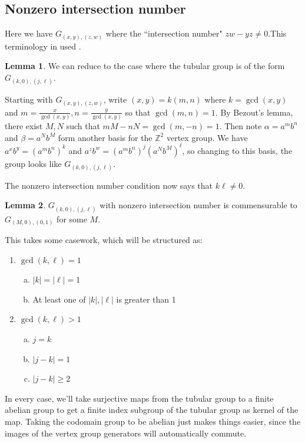 \documentclass[10pt]{article}
\def\integers{{\mathbb{Z}}}
\theoremstyle{definition}
\newtheorem{lemma}{Lemma}
\begin{document}
\subsection{Nonzero intersection number}
Here we have $G_{(x,y),(z,w)}$ where the ``intersection number" $zw-yz \ne 0$.This terminology in used \cite{Cat0}. 

\begin{lemma}\label{basis}
    We can reduce to the case where the tubular group is of the form $G_{(k,0),(j,\ell)}$. 
\end{lemma}
Starting with $G_{(x,y),(z,w)}$, write $(x,y) = k(m,n)$ where $k=\gcd(x,y)$ and $m=\frac{x}{\gcd(x,y)}, n=\frac{y}{\gcd(x,y)}$ so that $\gcd(m,n)=1$. By Bezout's lemma, there exist $M, N$ such that $mM - nN = \gcd(m,-n)=1$. Then note $\alpha= a^m b^n$ and $\beta = a^N b^M$ form another basis for the $\integers^2$ vertex group. We have $a^x b^y = (a^m b^n)^k$ and $a^z b^w = (a^m b^n)^j (a^N b^M)^\ell$, so changing to this basis, the group looks like $G_{(k,0),(j,\ell)}$. 

\begin{center}
\end{center}

The nonzero intersection number condition now says that $k \ell \ne 0$. 

\begin{lemma}
     $G_{(k,0),(j,\ell)}$ with nonzero intersection number is commensurable to $G_{(M,0),(0,1)}$ for some $M$. 
\end{lemma}
This takes some casework, which will be structured as:
\begin{enumerate}[label=Case \arabic*:]
    \item $\gcd(k,\ell)=1$
    \begin{enumerate}[(a)]
        \item $|k|=|\ell|=1$
        \item At least one of $|k|,|\ell|$  is greater than 1
    \end{enumerate}
    \item $\gcd(k,\ell)>1$
    \begin{enumerate}[(a)]
        \item $j=k$
        \item $|j-k|=1$
        \item $|j-k|\geq 2$
    \end{enumerate}
\end{enumerate}
In every case, we'll take surjective maps from the tubular group to a finite abelian group to get a finite index subgroup of the tubular group as kernel of the map. Taking the codomain group to be abelian just makes things easier, since the images of the vertex group generators will automatically commute. 
\end{document}
